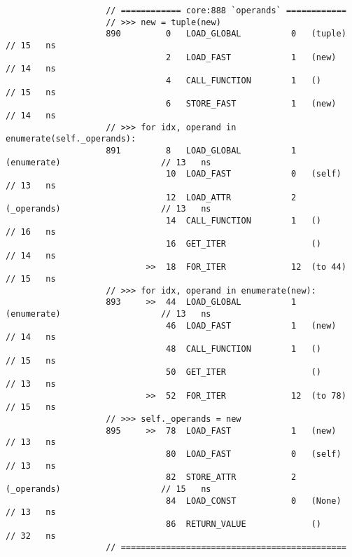 \begin{code}
\begin{verbatim}
                    // ============ core:888 `operands` ============
                    // >>> new = tuple(new)
                    890         0   LOAD_GLOBAL          0   (tuple)                        // 15   ns
                                2   LOAD_FAST            1   (new)                          // 14   ns
                                4   CALL_FUNCTION        1   ()                             // 15   ns
                                6   STORE_FAST           1   (new)                          // 14   ns
                    // >>> for idx, operand in enumerate(self._operands):
                    891         8   LOAD_GLOBAL          1   (enumerate)                    // 13   ns
                                10  LOAD_FAST            0   (self)                         // 13   ns
                                12  LOAD_ATTR            2   (_operands)                    // 13   ns
                                14  CALL_FUNCTION        1   ()                             // 16   ns
                                16  GET_ITER                 ()                             // 14   ns
                            >>  18  FOR_ITER             12  (to 44)                        // 15   ns
                    // >>> for idx, operand in enumerate(new):
                    893     >>  44  LOAD_GLOBAL          1   (enumerate)                    // 13   ns
                                46  LOAD_FAST            1   (new)                          // 14   ns
                                48  CALL_FUNCTION        1   ()                             // 15   ns
                                50  GET_ITER                 ()                             // 13   ns
                            >>  52  FOR_ITER             12  (to 78)                        // 15   ns
                    // >>> self._operands = new
                    895     >>  78  LOAD_FAST            1   (new)                          // 13   ns
                                80  LOAD_FAST            0   (self)                         // 13   ns
                                82  STORE_ATTR           2   (_operands)                    // 15   ns
                                84  LOAD_CONST           0   (None)                         // 13   ns
                                86  RETURN_VALUE             ()                             // 32   ns
                    // =============================================


\end{verbatim}
\end{code}
